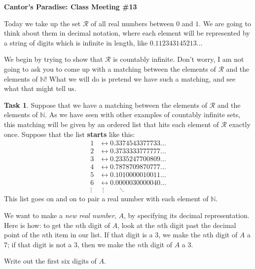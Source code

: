 \documentclass[12pt]{amsart}
\theoremstyle{definition}
\newtheorem{task}{Task}
\begin{document}
\begin{center}
\textbf{\Huge
Cantor's Paradise: Class Meeting \#13
}
\end{center}


\vspace{.5in}

Today we take up  the set $\mathcal{R}$ of all real numbers between $0$ and $1$.
We are going to think about them in decimal notation, where each element will be represented by a string of digits which is infinite in length, like $0.112343145213\ldots$

We begin by trying to show that $\mathcal{R}$ is countably infinite.
Don't worry, I am not going to ask you to come up with a matching between the elements of $\mathcal{R}$ and the elements of $\mathbb{N}$!
What we will do is pretend we have such a matching, and see what that might tell us.

\begin{task}
Suppose that we have a matching between the elements of $\mathcal{R}$ and the elements of $\mathbb{N}$.
As we have seen with other examples of countably infinite sets, this matching will be given by an ordered list that hits each element of $\mathcal{R}$ exactly once.
Suppose that the list \textbf{starts} like this:
\begin{align*}
1 & \leftrightarrow  0.3374543377733 \dots \\
2 & \leftrightarrow  0.3733333777777 \dots \\
3 & \leftrightarrow  0.2335247700809 \dots \\
4 & \leftrightarrow  0.7878709870777 \dots \\
5 & \leftrightarrow  0.1010000010011 \dots \\
6 & \leftrightarrow  0.0000030000040 \dots \\
\vdots & \ \ \vdots  \qquad \ddots
\end{align*}
This list goes on and on to pair a real number with each element of $\mathbb{N}$.

We want to make a \emph{new real number}, $A$, by specifying its decimal representation.
Here is how: to get the $n$th digit of $A$, look at the $n$th digit past the decimal point of the $n$th item in our list.
If that digit is a $3$, we make the $n$th digit of $A$ a $7$; if that digit is not a $3$, then we make the $n$th digit of $A$ a $3$.

Write out the first six digits of $A$.

\end{task}
\end{document}
